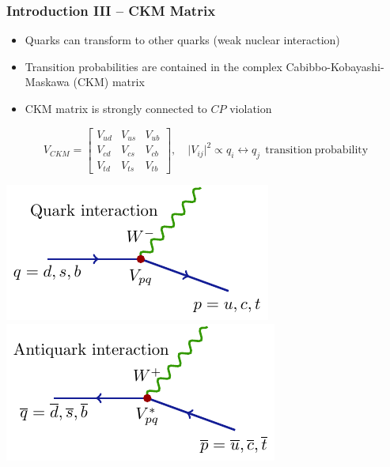 \documentclass[serif]{beamer}
\begin{document}
\begin{frame}[t]
\frametitle{Introduction III -- CKM Matrix}
\small
\vspace{-3mm}
\begin{block}{}
	\begin{itemize}
		\item Quarks can transform to other quarks (weak nuclear interaction)
		\item Transition probabilities are contained in the complex Cabibbo-Kobayashi-Maskawa (CKM) matrix
		\item CKM matrix is strongly connected to $CP$ violation

	\end{itemize}
	$$V_{CKM} = \begin{bmatrix} V_{ud} & V_{us} & V_{ub} \\ V_{cd} & V_{cs} & V_{cb} \\ V_{td} & V_{ts} & V_{tb} \end{bmatrix}, \quad \vert V_{ij}\vert^2 \propto q_i \leftrightarrow q_j~~\mathrm{transition~probability} $$
\end{block}

\begin{center}
	\includegraphics[scale=0.95]{texfig/quark_transition}
	\includegraphics[scale=0.95]{texfig/antiquark_transition}
\end{center}

\end{frame}

\end{document}
